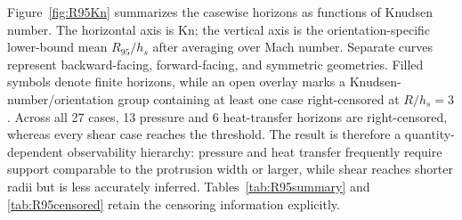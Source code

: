 \documentclass[aip,pof,preprint,floatfix,amsmath,amssymb]{revtex4-2}
\newcommand{\Kn}{\mathrm{Kn}}
\begin{document}
\begin{table}[t]
\centering
\caption{Closed-loop preservation of the model-conditional information footprint. $\Delta R_{95}$ is surrogate minus raw DSMC in units of $h_s$; $\Delta E_{\rm full}$ is the increase in full-domain relative error in percentage points. Brackets give 2.5--97.5 percentile intervals over 20 diagnostic random seeds.}
\label{tab:closedloop}
\scriptsize
{}
\end{table}

Figure~\ref{fig:R95Kn} summarizes the casewise horizons as functions of Knudsen number. The horizontal axis is $\Kn$; the vertical axis is the orientation-specific lower-bound mean $R_{95}/h_s$ after averaging over Mach number. Separate curves represent backward-facing, forward-facing, and symmetric geometries. Filled symbols denote finite horizons, while an open overlay marks a Knudsen-number/orientation group containing at least one case right-censored at $R/h_s=3$. Across all 27 cases, 13 pressure and 6 heat-transfer horizons are right-censored, whereas every shear case reaches the threshold. The result is therefore a quantity-dependent observability hierarchy: pressure and heat transfer frequently require support comparable to the protrusion width or larger, while shear reaches shorter radii but is less accurately inferred. Tables~\ref{tab:R95summary} and \ref{tab:R95censored} retain the censoring information explicitly.
\end{document}
